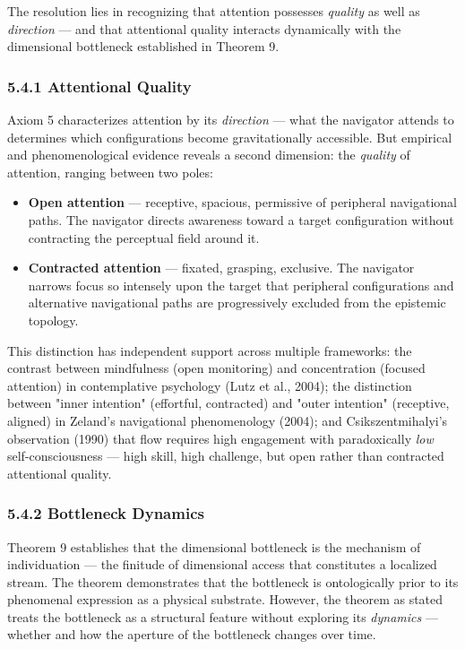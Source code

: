 The resolution lies in recognizing that attention possesses \textit{quality} as well as \textit{direction} — and that attentional quality interacts dynamically with the dimensional bottleneck established in Theorem 9.


\subsubsection*{5.4.1 Attentional Quality}


Axiom 5 characterizes attention by its \textit{direction} — what the navigator attends to determines which configurations become gravitationally accessible. But empirical and phenomenological evidence reveals a second dimension: the \textit{quality} of attention, ranging between two poles:


\begin{itemize}[nosep,leftmargin=*]
  \item \textbf{Open attention} — receptive, spacious, permissive of peripheral navigational paths. The navigator directs awareness toward a target configuration without contracting the perceptual field around it.
  \item \textbf{Contracted attention} — fixated, grasping, exclusive. The navigator narrows focus so intensely upon the target that peripheral configurations and alternative navigational paths are progressively excluded from the epistemic topology.
\end{itemize}


This distinction has independent support across multiple frameworks: the contrast between mindfulness (open monitoring) and concentration (focused attention) in contemplative psychology (Lutz et al., 2004); the distinction between "inner intention" (effortful, contracted) and "outer intention" (receptive, aligned) in Zeland's navigational phenomenology (2004); and Csikszentmihalyi's observation (1990) that flow requires high engagement with paradoxically \textit{low} self-consciousness — high skill, high challenge, but open rather than contracted attentional quality.


\subsubsection*{5.4.2 Bottleneck Dynamics}


Theorem 9 establishes that the dimensional bottleneck is the mechanism of individuation — the finitude of dimensional access that constitutes a localized stream. The theorem demonstrates that the bottleneck is ontologically prior to its phenomenal expression as a physical substrate. However, the theorem as stated treats the bottleneck as a structural feature without exploring its \textit{dynamics} — whether and how the aperture of the bottleneck changes over time.


